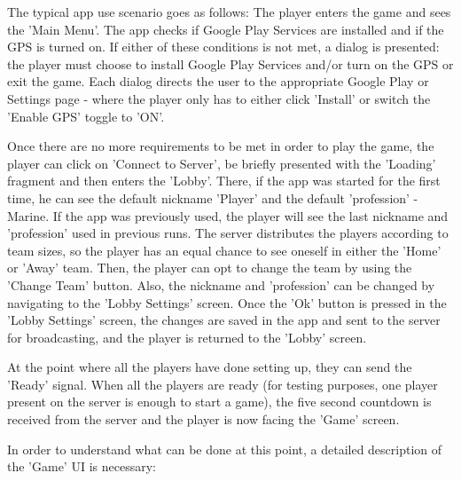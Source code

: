 \documentclass{article}
\begin{document}
The typical app use scenario goes as follows: The player enters the game and
sees the 'Main Menu'. The app checks if Google Play Services are installed and
if the GPS is turned on. If either of these conditions is not met, a dialog is
presented: the player must choose to install Google Play Services and/or turn on
the GPS or exit the game. Each dialog directs the user to the appropriate Google
Play or Settings page - where the player only has to either click 'Install' or
switch the 'Enable GPS' toggle to 'ON'.\newline

Once there are no more requirements to be met in order to play the game, the
player can click on 'Connect to Server', be briefly presented with the 'Loading'
fragment and then enters the 'Lobby'. There, if the app was started for the
first time, he can see the default nickname 'Player' and the default
'profession' - Marine. If the app was previously used, the player will see the
last nickname and 'profession' used in previous runs. The server distributes the
players according to team sizes, so the player has an equal chance to see
oneself in either the 'Home' or 'Away' team. Then, the player can opt to change
the team by using the 'Change Team' button. Also, the nickname and 'profession'
can be changed by navigating to the 'Lobby Settings' screen. Once the 'Ok'
button is pressed in the 'Lobby Settings' screen, the changes are saved in the
app and sent to the server for broadcasting, and the player is returned
to the 'Lobby' screen.\newline

At the point where all the players have done setting up, they can send the
'Ready' signal. When all the players are ready (for testing purposes, one
player present on the server is enough to start a game), the five second
countdown is received from the server and the player is now facing the 'Game'
screen.\newline

In order to understand what can be done at this point, a detailed description of
the 'Game' UI is necessary: \newline
 
\end{document}
